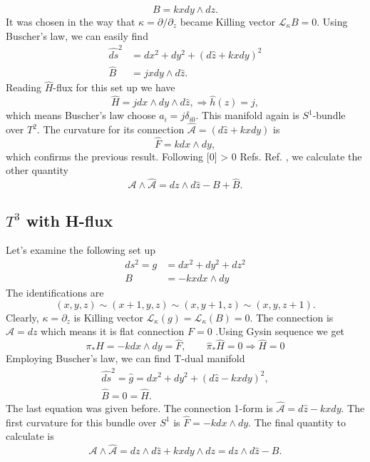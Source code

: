 \documentclass[a4paper]{article}
\renewcommand{\cite}[1]{%
\begingroup
\def\tempx{0}%
  \StrCount{#1}{,}[\tempx]%
  \ifnum\tempx > 0 
  Refs. %
  \else
  Ref. %
  \fi
\endgroup
\origcite{#1}%
}
\begin{document}
\begin{equation}
B = k x dy \wedge dz.
\end{equation}
It was chosen in the way that $\kappa = \partial / \partial_z$ became Killing vector $\mathcal{L}_\kappa B=0$. Using Buscher's law, we can easily find
\begin{align}
\hat{ds}^2 &= 	dx^2 + dy^2+ \left( d \hat{z} + k x dy \right)^2
\\
\hat{B} &= j x dy \wedge d\hat{z}.
\end{align}
Reading $\hat{H}$-flux for this set up we have
\begin{equation}
\hat{H} = j dx \wedge dy \wedge d \hat{z}, \Rightarrow \hat{h}(z) = j,
\end{equation}
which means Buscher's law choose $a_i = j \delta_{i 0}$. This manifold again is $S^1$-bundle over $T^2$. The curvature for its connection $\hat{\mathcal{A}} =\left( d \hat{z} + k x dy \right)$ is
\begin{equation}
\hat{F} = k dx \wedge dy,
\end{equation}
which confirms the previous result. Following \cite{mathai}, we calculate the other quantity
\begin{equation}
\mathcal{A} \wedge \hat{\mathcal{A}} = dz \wedge d \hat{z} - B +\hat{B}.
\end{equation}
\subsection{$T^3$ with H-flux}
Let's examine the following set up 
\begin{align}
ds^2 = g &= dx^2+dy^2 + dz^2
\\
B & =- k x dx \wedge dy
\end{align}
The identifications are
\begin{equation}
(x, y, z) \sim (x+1, y, z) \sim (x, y+1, z) \sim (x, y, z+1).
\end{equation}
Clearly, $\kappa = \partial_z$ is Killing vector $\mathcal{L}_\kappa (g) = \mathcal{L}_\kappa (B) = 0$. The connection is $\mathcal{A}=  dz$ which means it is flat connection $F=0$ .Using Gysin sequence we get
\begin{equation}
\pi_* H = -k dx \wedge dy = \hat{F}, \qquad \hat{\pi}_* \hat{H}=0 \Rightarrow \hat{H}=0
\end{equation}
Employing Buscher's law, we can find T-dual manifold
\begin{align}
\hat{ds}^2 = \hat{g}= dx^2 +dy^2+\left(d \hat{z} - k x dy \right)^2,
\\
\hat{B}=0 = \hat{H}.
\end{align} 
The last equation was given before. The connection 1-form is $\hat{\mathcal{A}}= d \hat{z} - k x dy $. The first curvature for this bundle over $S^1$ is  $\hat{F}= -k dx \wedge dy$. The final quantity to calculate is
\begin{equation}
\mathcal{A} \wedge \hat{\mathcal{A}} = dz \wedge d \hat{z} + k x dy \wedge dz = dz \wedge d \hat{z} -B.
\end{equation}
\end{document}
